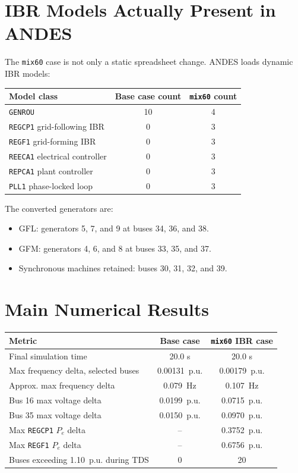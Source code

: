 \documentclass[11pt,letterpaper]{article}
\begin{document}
\section{IBR Models Actually Present in ANDES}

The \texttt{mix60} case is not only a static spreadsheet change. ANDES loads
dynamic IBR models:

\begin{center}
\begin{tabular}{lcc}
\toprule
Model class & Base case count & \texttt{mix60} count \\
\midrule
\texttt{GENROU} & 10 & 4 \\
\texttt{REGCP1} grid-following IBR & 0 & 3 \\
\texttt{REGF1} grid-forming IBR & 0 & 3 \\
\texttt{REECA1} electrical controller & 0 & 3 \\
\texttt{REPCA1} plant controller & 0 & 3 \\
\texttt{PLL1} phase-locked loop & 0 & 3 \\
\bottomrule
\end{tabular}
\end{center}

The converted generators are:

\begin{itemize}
  \item GFL: generators 5, 7, and 9 at buses 34, 36, and 38.
  \item GFM: generators 4, 6, and 8 at buses 33, 35, and 37.
  \item Synchronous machines retained: buses 30, 31, 32, and 39.
\end{itemize}

\section{Main Numerical Results}

\begin{center}
\begin{tabular}{lcc}
\toprule
Metric & Base case & \texttt{mix60} IBR case \\
\midrule
Final simulation time & 20.0 s & 20.0 s \\
Max frequency delta, selected buses & 0.00131~p.u. & 0.00179~p.u. \\
Approx. max frequency delta & 0.079~Hz & 0.107~Hz \\
Bus 16 max voltage delta & 0.0199~p.u. & 0.0715~p.u. \\
Bus 35 max voltage delta & 0.0150~p.u. & 0.0970~p.u. \\
Max \texttt{REGCP1} \(P_e\) delta & -- & 0.3752~p.u. \\
Max \texttt{REGF1} \(P_e\) delta & -- & 0.6756~p.u. \\
Buses exceeding 1.10~p.u. during TDS & 0 & 20 \\
\bottomrule
\end{tabular}
\end{center}
\end{document}
